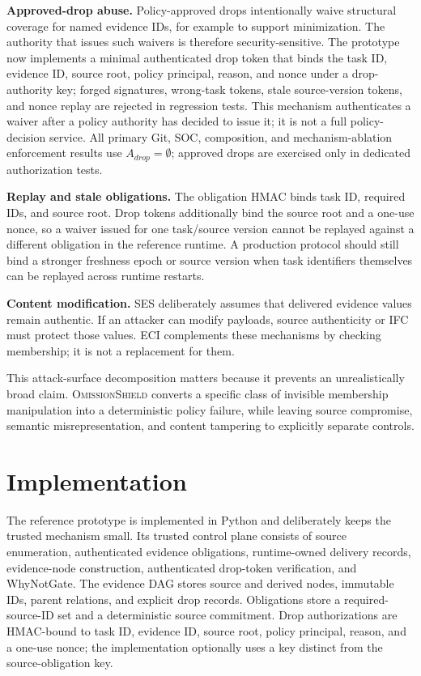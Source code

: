 \documentclass[journal,compsoc]{IEEEtran}
\newcommand{\system}{\textsc{OmissionShield}}
\begin{document}
\noindent\textbf{Approved-drop abuse.}
Policy-approved drops intentionally waive structural coverage for named evidence IDs, for example to support minimization. The authority that issues such waivers is therefore security-sensitive. The prototype now implements a minimal authenticated drop token that binds the task ID, evidence ID, source root, policy principal, reason, and nonce under a drop-authority key; forged signatures, wrong-task tokens, stale source-version tokens, and nonce replay are rejected in regression tests. This mechanism authenticates a waiver after a policy authority has decided to issue it; it is not a full policy-decision service. All primary Git, SOC, composition, and mechanism-ablation enforcement results use $A_{drop}=\emptyset$; approved drops are exercised only in dedicated authorization tests.

\noindent\textbf{Replay and stale obligations.}
The obligation HMAC binds task ID, required IDs, and source root. Drop tokens additionally bind the source root and a one-use nonce, so a waiver issued for one task/source version cannot be replayed against a different obligation in the reference runtime. A production protocol should still bind a stronger freshness epoch or source version when task identifiers themselves can be replayed across runtime restarts.

\noindent\textbf{Content modification.}
SES deliberately assumes that delivered evidence values remain authentic. If an attacker can modify payloads, source authenticity or IFC must protect those values. ECI complements these mechanisms by checking membership; it is not a replacement for them.

This attack-surface decomposition matters because it prevents an unrealistically broad claim. \system{} converts a specific class of invisible membership manipulation into a deterministic policy failure, while leaving source compromise, semantic misrepresentation, and content tampering to explicitly separate controls.

\section{Implementation}
The reference prototype is implemented in Python and deliberately keeps the trusted mechanism small. Its trusted control plane consists of source enumeration, authenticated evidence obligations, runtime-owned delivery records, evidence-node construction, authenticated drop-token verification, and WhyNotGate. The evidence DAG stores source and derived nodes, immutable IDs, parent relations, and explicit drop records. Obligations store a required-source-ID set and a deterministic source commitment. Drop authorizations are HMAC-bound to task ID, evidence ID, source root, policy principal, reason, and a one-use nonce; the implementation optionally uses a key distinct from the source-obligation key.
\end{document}
